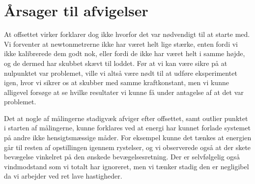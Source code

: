 \section{Årsager til afvigelser}
At offsettet virker forklarer dog ikke hvorfor det var nødvendigt til at starte med. Vi forventer at newtonmetrerne ikke har været helt lige stærke, 
enten fordi vi ikke kalibrerede dem godt nok, eller fordi de ikke har været helt i samme højde, og de dermed har skubbet skævt til loddet.
Før at vi kan være sikre på at nulpunktet var problemet, ville vi altså være nødt til at udføre eksperimentet igen, hvor vi sikrer os at skubber med samme kraftkonstant, 
men vi kunne alligevel forsøge at se hvilke resultater vi kunne få under antagelse af at det var problemet. 

Det at nogle af målingerne stadigvæk afviger efter offsettet, samt outlier punktet i starten af målingerne, kunne forklares ved at energi har kunnet forlade systemet på andre ikke hensigtsmæssige måder. 
For eksempel kunne det tænkes at energien går til resten af opstillingen igennem rystelser, og vi observerede også at der skete bevægelse vinkelret på den ønskede bevægelsesretning.
Der er selvfølgelig også vindmodstand som vi totalt har ignoreret, men vi tænker stadig den er negligibel da vi arbejder ved ret lave hastigheder.

